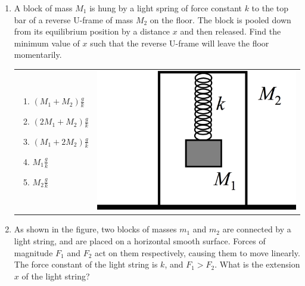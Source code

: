 \documentclass[12pt,letterpaper]{article}
\begin{document}
\begin{enumerate}
\item
A block of mass $M_1$ is hung by a light spring of force constant $k$ to the top bar of a reverse U-frame of mass $M_2$ on the floor. The block is pooled down from its equilibrium position by a distance $x$ and then released. Find the minimum value of $x$ such that the reverse U-frame will leave the floor momentarily.

\begin{tabular}{l r}

\begin{minipage}{0.6\textwidth}
\begin{enumerate}
\item $\displaystyle \left(M_1 + M_2\right)\frac{g}{k}$
\item $\displaystyle \left(2M_1 + M_2\right)\frac{g}{k}$
\item $\displaystyle \left(M_1 + 2M_2\right)\frac{g}{k}$
\item $\displaystyle M_1\frac{g}{k}$
\item $\displaystyle M_2\frac{g}{k}$
\end{enumerate}
\end{minipage} &
\begin{minipage}{0.3\textwidth}
\includegraphics[width=\textwidth]{spring.png}
\end{minipage}
\end{tabular}

\vfill
\newpage

\item
As shown in the figure, two blocks of masses $m_1$ and $m_2$ are connected by a light string, and are placed on a horizontal smooth surface. Forces of magnitude $F_1$ and $F_2$ act on them respectively, causing them to move linearly. The force constant of the light string is $k$, and $F_1 > F_2$. What is the extension $x$ of the light string?


\end{enumerate}
\end{document}
